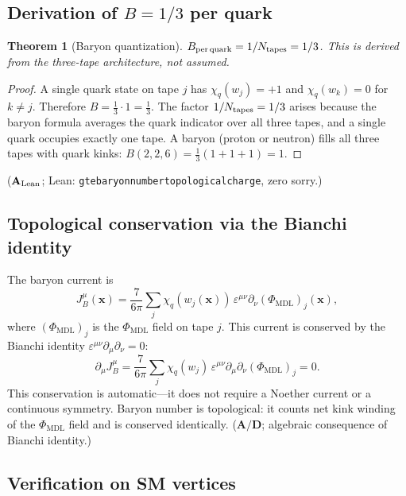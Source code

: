 \documentclass[11pt]{article}
\newtheorem{theorem}{Theorem}[section]
\theoremstyle{remark}
\newcommand{\PHIMDL}{\Phi_{\mathrm{MDL}}}
\newcommand{\lean}[1]{%
  \penalty-100
  \begingroup\def\_{\textunderscore\allowbreak}\texttt{#1}\endgroup}
\newcommand{\CatAL}{\ensuremath{\textbf{A}_{\rm Lean}}}
\newcommand{\CatAD}{\textbf{A/D}}
\begin{document}
\subsection{Derivation of $B = 1/3$ per quark}
\label{ssec:baryon_derivation}

\begin{theorem}[Baryon quantization]
$B_{\rm per\,quark} = 1/N_{\rm tapes} = 1/3$. This is derived from the
three-tape architecture, not assumed.
\end{theorem}

\begin{proof}
A single quark state on tape $j$ has $\chi_q(w_j) = +1$ and $\chi_q(w_k) = 0$
for $k\neq j$. Therefore $B = \tfrac{1}{3}\cdot 1 = \tfrac{1}{3}$. The factor
$1/N_{\rm tapes} = 1/3$ arises because the baryon formula averages the quark
indicator over all three tapes, and a single quark occupies exactly one tape.
A baryon (proton or neutron) fills all three tapes with quark kinks:
$B(2,2,6) = \tfrac{1}{3}(1+1+1) = 1$.
\end{proof}

\noindent
($\CatAL$; Lean: \lean{gte\_baryon\_number\_topological\_charge}, zero sorry.)

\subsection{Topological conservation via the Bianchi identity}
\label{ssec:bianchi}

The baryon current is
\[
  J^\mu_B(\mathbf{x}) = \frac{7}{6\pi}\sum_j \chi_q(w_j(\mathbf{x}))\,
  \varepsilon^{\mu\nu}\partial_\nu(\PHIMDL)_j(\mathbf{x}),
\]
where $(\PHIMDL)_j$ is the $\PHIMDL$ field on tape $j$. This current is
conserved by the Bianchi identity $\varepsilon^{\mu\nu}\partial_\mu\partial_\nu = 0$:
\[
  \partial_\mu J^\mu_B = \frac{7}{6\pi}\sum_j\chi_q(w_j)\,
  \varepsilon^{\mu\nu}\partial_\mu\partial_\nu(\PHIMDL)_j = 0.
\]
This conservation is automatic---it does not require a Noether current or
a continuous symmetry. Baryon number is topological: it counts net kink winding
of the $\PHIMDL$ field and is conserved identically. ($\CatAD$; algebraic consequence of Bianchi identity.)

\subsection{Verification on SM vertices}
\label{ssec:baryon_vertices}
\end{document}
